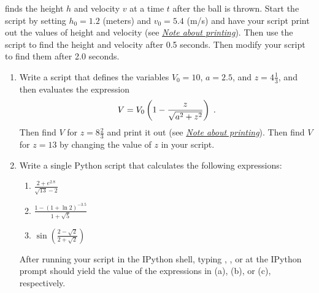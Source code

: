 \documentclass[letterpaper,10pt,english]{sphinxmanual}
\begin{document}
finds the height $h$ and velocity $v$ at a time $t$ after the ball is thrown. Start the script by setting $h_0 = 1.2$ (meters) and $v_0 = 5.4$ (m/s) and have your script print out the values of height and velocity (see {\hyperref[chap2/chap2_basics:printnote]{\emph{Note about printing}}}). Then use the script to find the height and velocity after 0.5 seconds. Then modify your script to find them after 2.0 seconds.
\begin{enumerate}
\item {} 
Write a script that defines the variables $V_0 = 10$, $a = 2.5$, and $z = 4\tfrac{1}{3}$, and then evaluates the expression
\begin{gather}
\begin{split}V = V_0 \left( 1 - \frac{z}{\sqrt{a^2+z^2}} \right) \;.\end{split}\notag
\end{gather}
Then find $V$ for $z=8\frac{2}{3}$ and print it out (see {\hyperref[chap2/chap2_basics:printnote]{\emph{Note about printing}}}). Then find $V$ for $z=13$ by changing the value of $z$ in your script.

\item {} 
Write a single Python script that calculates the following expressions:
\begin{enumerate}
\item {} 
$\displaystyle\frac{2 + e^{2.8}}{\sqrt{13}-2}$

\item {} 
$\displaystyle\frac{1-(1+\ln 2)^{-3.5}}{1+\sqrt{5}}$

\item {} 
$\displaystyle\sin\left( \frac{2-\sqrt{2}}{2+\sqrt{2}} \right)$

\end{enumerate}

After running your script in the IPython shell, typing , , or  at the IPython prompt should yield the value of the expressions in (a), (b), or (c), respectively.


\end{enumerate}
\end{document}
